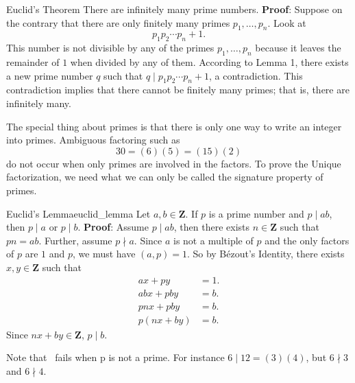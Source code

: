 \begin{Proposition}{Euclid's Theorem}{}
    There are infinitely many prime numbers.
    \tcblower{}
    \textbf{Proof}: Suppose on the contrary that there are only finitely many primes $ p_1,\ldots,p_n $. Look at
    \[ p_1p_2\cdots p_n+1. \]
    This number is not divisible by any of the primes $ p_1,\ldots,p_n $ because it leaves the remainder of $1$
    when divided by any of them. According to Lemma 1, there exists a new prime number $ q $ such that
    $ q\mid p_1p_2\cdots p_n+1 $, a contradiction. This contradiction implies that there cannot be finitely many primes;
    that is, there are infinitely many.
\end{Proposition}
The special thing about primes is that there is only one way to write an integer
into primes. Ambiguous factoring such as
\[ 30=(6)(5)=(15)(2) \]
do not occur when only primes are involved in the factors. To prove the Unique
factorization, we need what we can only be called the signature property of primes.
\begin{Proposition}{Euclid's Lemma}{euclid_lemma}
    Let $ a,b\in\mathbf{Z} $. If $ p $ is a prime number and $ p\mid ab $,
    then $ p\mid a $ or $ p\mid b $.
    \tcblower{}
    \textbf{Proof}: Assume $ p\mid ab $, then there exists $ n\in\mathbf{Z} $ such that $ pn=ab $.
    Further, assume $ p\nmid a $. Since $ a $ is not a multiple of $ p $ and the only factors of $ p $
    are $ 1 $ and $ p $, we must have $ (a,p)=1 $. So by Bézout's Identity, there exists $ x,y\in\mathbf{Z} $ such that
    \begin{align*}
        ax+py    & =1. \\
        abx+pby  & =b. \\
        pnx+pby  & =b. \\
        p(nx+by) & =b.
    \end{align*}
    Since $ nx+by\in\mathbf{Z} $, $ p\mid b $.
\end{Proposition}
Note that~ fails when p is not a prime. For instance
$ 6\mid 12=(3)(4) $, but $ 6\nmid 3 $ and $ 6\nmid 4 $.